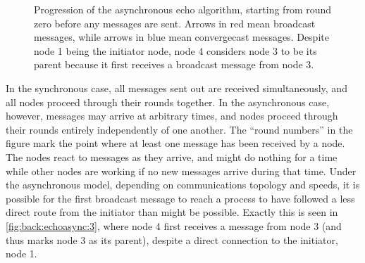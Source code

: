 \begin{figure}[htbp]
    \caption{Progression of the asynchronous echo algorithm, starting from round zero before any messages are sent.  Arrows in red mean broadcast messages, while arrows in blue mean convergecast messages.  Despite node 1 being the initiator node, node 4 considers node 3 to be its parent because it first receives a broadcast message from node 3.}
    \label{fig:back:echoasync}
\end{figure}

In the synchronous case, all messages sent out are received simultaneously, and all nodes proceed through their rounds together.  In the asynchronous case, however, messages may arrive at arbitrary times, and nodes proceed through their rounds entirely independently of one another.  The ``round numbers'' in the figure mark the point where at least one message has been received by a node.  The nodes react to messages as they arrive, and might do nothing for a time while other nodes are working if no new messages arrive during that time.  Under the asynchronous model, depending on communications topology and speeds, it is possible for the first broadcast message to reach a process to have followed a less direct route from the initiator than might be possible.  Exactly this is seen in \cref{fig:back:echoasync:3}, where node 4 first receives a message from node 3 (and thus marks node 3 as its parent), despite a direct connection to the initiator, node 1.


